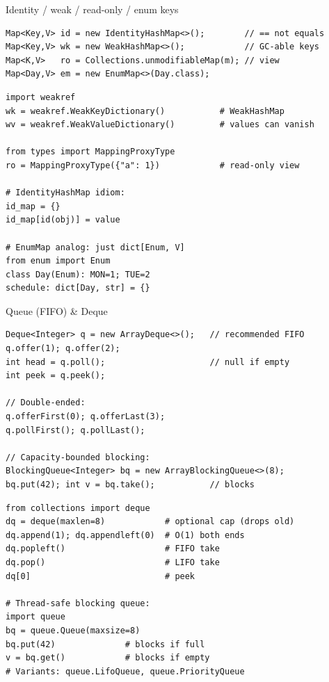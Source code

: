 \documentclass[10pt]{article}
\begin{document}
\begin{construct}{Identity / weak / read-only / enum keys}
\noindent
\begin{minipage}[t]{0.485\linewidth}
\begin{lstlisting}[style=java, title=Java]
Map<Key,V> id = new IdentityHashMap<>();        // == not equals
Map<Key,V> wk = new WeakHashMap<>();            // GC-able keys
Map<K,V>   ro = Collections.unmodifiableMap(m); // view
Map<Day,V> em = new EnumMap<>(Day.class);
\end{lstlisting}
\end{minipage}\hfill
\begin{minipage}[t]{0.485\linewidth}
\begin{lstlisting}[style=python, title=Python]
import weakref
wk = weakref.WeakKeyDictionary()           # WeakHashMap
wv = weakref.WeakValueDictionary()         # values can vanish

from types import MappingProxyType
ro = MappingProxyType({"a": 1})            # read-only view

# IdentityHashMap idiom:
id_map = {}
id_map[id(obj)] = value

# EnumMap analog: just dict[Enum, V]
from enum import Enum
class Day(Enum): MON=1; TUE=2
schedule: dict[Day, str] = {}
\end{lstlisting}
\end{minipage}
\end{construct}


\begin{construct}{Queue (FIFO) \& Deque}
\noindent
\begin{minipage}[t]{0.485\linewidth}
\begin{lstlisting}[style=java, title=Java]
Deque<Integer> q = new ArrayDeque<>();   // recommended FIFO
q.offer(1); q.offer(2);
int head = q.poll();                     // null if empty
int peek = q.peek();

// Double-ended:
q.offerFirst(0); q.offerLast(3);
q.pollFirst(); q.pollLast();

// Capacity-bounded blocking:
BlockingQueue<Integer> bq = new ArrayBlockingQueue<>(8);
bq.put(42); int v = bq.take();           // blocks
\end{lstlisting}
\end{minipage}\hfill
\begin{minipage}[t]{0.485\linewidth}
\begin{lstlisting}[style=python, title=Python]
from collections import deque
dq = deque(maxlen=8)            # optional cap (drops old)
dq.append(1); dq.appendleft(0)  # O(1) both ends
dq.popleft()                    # FIFO take
dq.pop()                        # LIFO take
dq[0]                           # peek

# Thread-safe blocking queue:
import queue
bq = queue.Queue(maxsize=8)
bq.put(42)              # blocks if full
v = bq.get()            # blocks if empty
# Variants: queue.LifoQueue, queue.PriorityQueue
\end{lstlisting}
\end{minipage}
\end{construct}
\end{document}
